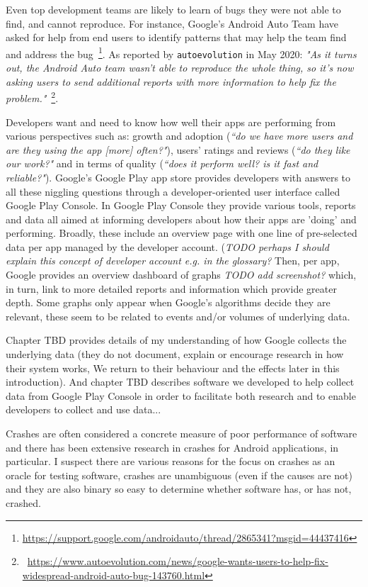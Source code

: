 Even top development teams are likely to learn of bugs they were not able to find, and cannot reproduce. For instance, Google's Android Auto Team have asked for help from end users to identify patterns that may help the team find and address the bug~\footnote{\url{https://support.google.com/androidauto/thread/2865341?msgid=44437416}}. As reported by \texttt{autoevolution} in May 2020:  
\emph{"As it turns out, the Android Auto team wasn’t able to reproduce the whole thing, so it’s now asking users to send additional reports with more information to help fix the problem."}~\footnote{~\url{https://www.autoevolution.com/news/google-wants-users-to-help-fix-widespread-android-auto-bug-143760.html}}.

Developers want and need to know how well their apps are performing from various perspectives such as: growth and adoption (\emph{``do we have more users and are they using the app [more] often?"}), users' ratings and reviews (\emph{``do they like our work?"} and in terms of quality (\emph{``does it perform well? is it fast and reliable?"}). Google's Google Play app store provides developers with answers to all these niggling questions through a developer-oriented user interface called Google Play Console. 
In Google Play Console they provide various tools, reports and data all aimed at informing developers about how their apps are 'doing' and performing. Broadly, these include an overview page with one line of pre-selected data per app managed by the developer account. (\emph{TODO perhaps I should explain this concept of developer account e.g. in the glossary?} Then, per app, Google provides an overview dashboard of graphs \emph{TODO add screenshot?} which, in turn, link to more detailed reports and information which provide greater depth. Some graphs only appear when Google's algorithms decide they are relevant, these seem to be related to events and/or volumes of underlying data.

Chapter TBD provides details of my understanding of how Google collects the underlying data (they do not document, explain or encourage research in how their system works, We return to their behaviour and the effects later in this introduction). And chapter TBD describes software we developed to help collect data from Google Play Console in order to facilitate both research and to enable developers to collect and use data...

Crashes are often considered a concrete measure of poor performance of software and there has been extensive research in crashes for Android applications, in particular. I suspect there are various reasons for the focus on crashes as an oracle for testing software, crashes are unambiguous (even if the causes are not) and they are also binary so easy to determine whether software has, or has not, crashed. 

